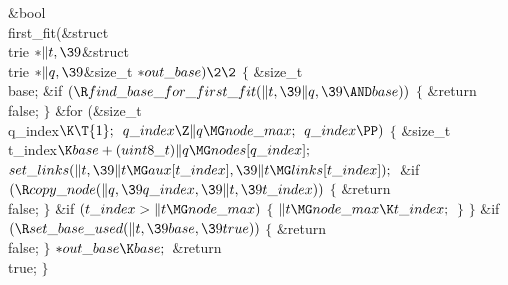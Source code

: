\Y\B\1\1\&{bool} \\{first\_fit}(\&{struct} \\{trie} ${}{*}\|t,\39{}$\&{struct} %
\\{trie} ${}{*}\|q,\39{}$\&{size\_t} ${}{*}\\{out\_base})\2\2{}$\6
${}\{{}$\1\6
\&{size\_t} \\{base};\7
\&{if} ${}(\R\\{find\_base\_for\_first\_fit}(\|t,\39\|q,\39{\AND}\\{base})){}$\5
${}\{{}$\1\6
\&{return} \\{false};\6
\4${}\}{}$\2\6
\&{for} (\&{size\_t} \\{q\_index}${}\K\T{1};{}$ ${}\\{q\_index}\Z\|q\MG\\{node%
\_max};{}$ ${}\\{q\_index}\PP){}$\5
${}\{{}$\1\6
\&{size\_t} \\{t\_index}${}\K\\{base}+(\\{uint8\_t})\|q\MG\\{nodes}[\\{q%
\_index}];{}$\7
${}\\{set\_links}(\|t,\39\|t\MG\\{aux}[\\{t\_index}],\39\|t\MG\\{links}[\\{t%
\_index}]);{}$\6
\&{if} ${}(\R\\{copy\_node}(\|q,\39\\{q\_index},\39\|t,\39\\{t\_index})){}$\5
${}\{{}$\1\6
\&{return} \\{false};\6
\4${}\}{}$\2\6
\&{if} ${}(\\{t\_index}>\|t\MG\\{node\_max}){}$\5
${}\{{}$\1\6
${}\|t\MG\\{node\_max}\K\\{t\_index};{}$\6
\4${}\}{}$\2\6
\4${}\}{}$\2\6
\&{if} ${}(\R\\{set\_base\_used}(\|t,\39\\{base},\39\\{true})){}$\5
${}\{{}$\1\6
\&{return} \\{false};\6
\4${}\}{}$\2\6
${}{*}\\{out\_base}\K\\{base};{}$\6
\&{return} \\{true};\6
\4${}\}{}$\2\par
\fi

